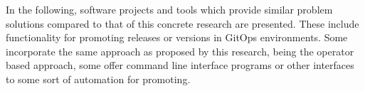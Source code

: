 











In the following,
software projects and tools
which provide similar problem solutions compared to that of
this concrete research are presented.
These include functionality for promoting releases or versions
in GitOps environments.
Some incorporate the same approach as proposed by this research,
being the operator based approach,
some offer command line interface programs or other interfaces
to some sort of automation for promoting.

